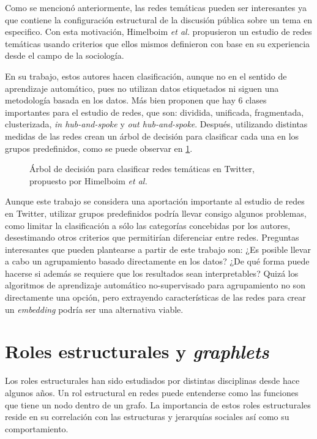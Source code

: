 Como se mencionó anteriormente, las redes temáticas pueden ser interesantes ya que contiene la configuración estructural de la discusión pública sobre un tema en especifico. Con esta motivación, Himelboim \textit{ et al.} propusieron un estudio de redes temáticas usando criterios que ellos mismos definieron con base en su experiencia desde el campo de la sociología. 

En su trabajo, estos autores hacen clasificación, aunque no en el sentido de aprendizaje automático, pues no utilizan datos etiquetados ni siguen una metodología basada en los datos. Más bien proponen que hay 6 clases importantes para el estudio de redes, que son: dividida, unificada, fragmentada, clusterizada, \textit{in hub-and-spoke} y \textit{out hub-and-spoke}. Después, utilizando distintas medidas de las redes crean un árbol de decisión para clasificar cada una en los grupos predefinidos, como se puede observar en \ref{fig:himelboim}.

 \begin{figure}[htbp]
   \centering
   
    \caption{Árbol de decisión para clasificar redes temáticas en Twitter, propuesto por Himelboim \textit{ et al.} \cite{himelboim_classifying_2017}} %
    \label{fig:himelboim}
\end{figure}

Aunque este trabajo se considera una aportación importante al estudio de redes en Twitter, utilizar grupos predefinidos podría llevar consigo algunos problemas, como limitar la clasificación a sólo las categorías concebidas por los autores, desestimando otros criterios que permitirían diferenciar entre redes. Preguntas interesantes que pueden plantearse a partir de este trabajo son: ¿Es posible llevar a cabo un agrupamiento basado directamente en los datos? ¿De qué forma puede hacerse si además se requiere que los resultados sean interpretables? Quizá los algoritmos de aprendizaje automático no-supervisado para agrupamiento no son directamente una opción, pero extrayendo características de las redes para crear un \textit{embedding} podría ser una alternativa viable.

\section{Roles estructurales y \textit{graphlets}} 

Los roles estructurales han sido estudiados por distintas disciplinas desde hace algunos años. Un rol estructural en redes puede entenderse como las funciones que tiene un nodo dentro de un grafo. La importancia de estos roles estructurales reside en su correlación con las estructuras y jerarquías sociales así como su comportamiento. 

